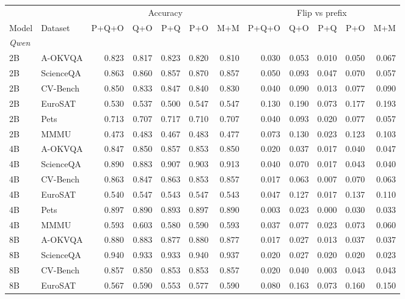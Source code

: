 \begin{tabular}{llrrrrr rrrrr}
\toprule
 & & \multicolumn{5}{c}{Accuracy} & \multicolumn{5}{c}{Flip vs prefix} \\
\cmidrule(lr){3-7}\cmidrule(l){8-12}
Model & Dataset & P+Q+O & Q+O & P+Q & P+O & M+M & P+Q+O & Q+O & P+Q & P+O & M+M \\
\midrule
\multicolumn{12}{l}{\textit{Qwen}} \\
2B & A-OKVQA & 0.823 & 0.817 & 0.823 & 0.820 & 0.810 & 0.030 & 0.053 & 0.010 & 0.050 & 0.067 \\
2B & ScienceQA & 0.863 & 0.860 & 0.857 & 0.870 & 0.857 & 0.050 & 0.093 & 0.047 & 0.070 & 0.057 \\
2B & CV-Bench & 0.850 & 0.833 & 0.847 & 0.840 & 0.830 & 0.040 & 0.090 & 0.013 & 0.077 & 0.090 \\
2B & EuroSAT & 0.530 & 0.537 & 0.500 & 0.547 & 0.547 & 0.130 & 0.190 & 0.073 & 0.177 & 0.193 \\
2B & Pets & 0.713 & 0.707 & 0.717 & 0.710 & 0.707 & 0.040 & 0.093 & 0.020 & 0.077 & 0.057 \\
2B & MMMU & 0.473 & 0.483 & 0.467 & 0.483 & 0.477 & 0.073 & 0.130 & 0.023 & 0.123 & 0.103 \\
4B & A-OKVQA & 0.847 & 0.850 & 0.857 & 0.853 & 0.850 & 0.020 & 0.037 & 0.017 & 0.040 & 0.047 \\
4B & ScienceQA & 0.890 & 0.883 & 0.907 & 0.903 & 0.913 & 0.040 & 0.070 & 0.017 & 0.043 & 0.040 \\
4B & CV-Bench & 0.863 & 0.847 & 0.863 & 0.853 & 0.857 & 0.017 & 0.063 & 0.007 & 0.070 & 0.063 \\
4B & EuroSAT & 0.540 & 0.547 & 0.543 & 0.547 & 0.543 & 0.047 & 0.127 & 0.017 & 0.137 & 0.110 \\
4B & Pets & 0.897 & 0.890 & 0.893 & 0.897 & 0.890 & 0.003 & 0.023 & 0.000 & 0.030 & 0.033 \\
4B & MMMU & 0.593 & 0.603 & 0.580 & 0.590 & 0.593 & 0.037 & 0.077 & 0.023 & 0.073 & 0.060 \\
8B & A-OKVQA & 0.880 & 0.883 & 0.877 & 0.880 & 0.877 & 0.017 & 0.027 & 0.013 & 0.037 & 0.037 \\
8B & ScienceQA & 0.940 & 0.933 & 0.933 & 0.940 & 0.937 & 0.020 & 0.027 & 0.020 & 0.020 & 0.023 \\
8B & CV-Bench & 0.857 & 0.850 & 0.853 & 0.853 & 0.857 & 0.020 & 0.040 & 0.003 & 0.043 & 0.043 \\
8B & EuroSAT & 0.567 & 0.590 & 0.553 & 0.577 & 0.590 & 0.080 & 0.163 & 0.073 & 0.160 & 0.150 \\

\end{tabular}
